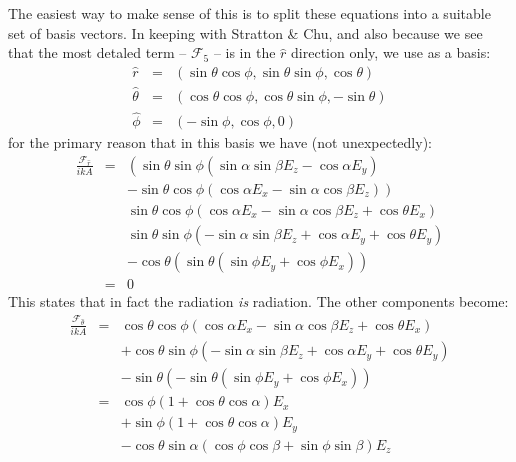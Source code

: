 \documentclass[a4article,12pt]{article}
\newcommand{\Fcal}[1]{{\mathcal F}_{#1}}
\begin{document}
The easiest way to make sense of this is to split these equations into a suitable set of basis vectors. In keeping with Stratton \& Chu, and also because we see that the most detaled term -- $\Fcal{5}$ -- is in the $\hat{r}$ direction only, we use as a basis:
%
\begin{eqnarray}
\hat{r} & = & \left( \sin \theta \cos \phi, \sin \theta \sin \phi, \cos \theta \right) \\
\hat{\theta} & = &  \left( \cos \theta \cos \phi, \cos \theta \sin \phi, - \sin \theta \right) \\
\hat{\phi} & = & \left( -\sin \phi, \cos \phi, 0 \right) 
\end{eqnarray}
%
for the primary reason that in this basis we have (not unexpectedly):
%
\begin{eqnarray}
\frac{\Fcal{\hat{r}}}{i k A} & = & \left( \sin \theta \sin \phi (\sin \alpha \sin \beta E_z - \cos \alpha E_y) \right. \nonumber  \\
&& \left. - \sin \theta \cos \phi ( \cos \alpha E_x - \sin \alpha \cos \beta E_z) \right) \nonumber \\
&& \sin \theta \cos \phi \left( \cos \alpha E_x - \sin \alpha \cos \beta E_z+\cos \theta E_x \right) \nonumber \\
&& \sin \theta \sin \phi \left( -\sin \alpha \sin \beta E_z + \cos \alpha E_y +\cos \theta E_y \right)\nonumber \\
&& - \cos \theta \left( \sin \theta ( \sin \phi E_y + \cos \phi E_x) \right) \nonumber \\
& = & 0
\end{eqnarray}
%
This states that in fact the radiation {\it is} radiation. The other components become:
%
\begin{eqnarray}
\frac{\Fcal{\hat{\theta}}}{i k A} & = & \cos \theta \cos \phi \left(\cos \alpha E_x - \sin \alpha \cos \beta E_z + \cos \theta E_x \right) \nonumber \\
&& + \cos \theta \sin \phi \left( -\sin \alpha \sin \beta E_z + \cos \alpha E_y + \cos \theta E_y \right) \nonumber \\
&& - \sin \theta \left(  -\sin \theta ( \sin \phi E_y + \cos \phi E_x) \right) \nonumber \\
& = & \cos \phi \left( 1 + \cos \theta \cos \alpha \right) E_x \nonumber \\
&& + \sin \phi \left( 1 + \cos \theta \cos \alpha \right)  E_y \nonumber \\
&& - \cos \theta \sin \alpha \left(  \cos \phi \cos \beta + \sin \phi \sin \beta \right) E_z
\end{eqnarray}
\end{document}
